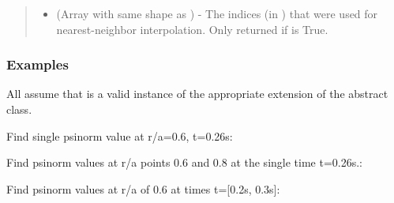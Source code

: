 \documentclass[letterpaper,10pt,english]{sphinxmanual}
\begin{document}
\begin{fulllineitems}
\begin{fulllineitems}
\begin{quote}
\begin{description}
\begin{itemize}
\item {} 
 (Array with same shape as ) - The indices
(in ) that were used for
nearest-neighbor interpolation. Only returned if  is
True.

\end{itemize}


\end{description}\end{quote}
\subsubsection*{Examples}

All assume that  is a valid instance of the appropriate
extension of the {\hyperref[\detokenize{eqtools:eqtools.core.Equilibrium}]{}} abstract class.

Find single psinorm value at r/a=0.6, t=0.26s:

\begin{sphinxVerbatim}[commandchars=\\\{\}]
   
\end{sphinxVerbatim}

Find psinorm values at r/a points 0.6 and 0.8 at the
single time t=0.26s.:

\begin{sphinxVerbatim}[commandchars=\\\{\}]
  \PYG{p}{[} \PYG{p}{]} 
\end{sphinxVerbatim}

Find psinorm values at r/a of 0.6 at times t={[}0.2s, 0.3s{]}:

\begin{sphinxVerbatim}[commandchars=\\\{\}]
   \PYG{p}{[} \PYG{p}{]}
\end{sphinxVerbatim}


\end{fulllineitems}
\end{fulllineitems}
\end{document}
